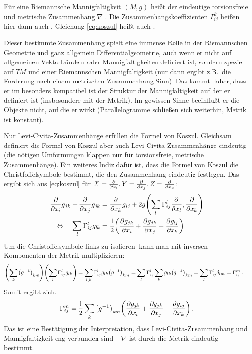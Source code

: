 \begin{defi}
Für eine Riemannsche Mannigfaltigkeit $(M, g)$ heißt der eindeutige torsionsfreie und metrische Zusammenhang $\nabla$ . Die Zusammenhangskoeffizienten $\Gamma_{ij}^k$ heißen hier dann auch . Gleichung \eqref{eq:koszul} heißt auch .
\end{defi}
Dieser bestimmte Zusammenhang spielt eine immense Rolle in der Riemannschen Geometrie und ganz allgemein Differentialgeometrie, auch wenn er nicht auf allgemeinen Vektorbündeln oder Mannigfaltigkeiten definiert ist, sondern speziell auf $TM$ und einer Riemannschen Mannigfaltigkeit (nur dann ergibt z.B.~die Forderung nach einem metrischen Zusammenhang Sinn). Das kommt daher, dass er im besonders kompatibel ist der Struktur der Mannigfaltigkeit auf der er definiert ist (insbesondere mit der Metrik). Im gewissen Sinne beeinflußt er die Objekte nicht, auf die er wirkt (Parallelogramme schließen sich weiterhin, Metrik ist konstant).

Nur Levi-Civita-Zusammenhänge erfüllen die Formel von Koszul. Gleichsam definiert die Formel von Koszul aber auch Levi-Civita-Zusammenhänge eindeutig (die nötigen Umformungen klappen nur für torsionsfreie, metrische Zusammenhänge). Ein weiteres Indiz dafür ist, dass die Formel von Koszul die Christfoffelsymbole bestimmt, die den Zusammenhang eindeutig festlegen. Das ergibt sich aus \eqref{eq:koszul} für $X = \pdv{x_i}, Y = \pdv{x_j}, Z = \pdv{x_k}$:
\begin{align*}
\pdv{x_i} g_{jk} + \pdv{x_j} g_{jk} &= \pdv{x_k} g_{ij} + 2 g\qty(\sum_l \Gamma_{ij}^l \pdv{x_l}, \pdv{x_k})%
\\
\Leftrightarrow \quad \sum_l \Gamma_{ij}^l g_{lk} &= \frac{1}{2} \qty(\pdv{g_{jk}}{x_i} + \pdv{g_{jk}}{x_j} - \pdv{g_{ij}}{x_k})
\end{align*}
Um die Christoffelsymbole links zu isolieren, kann man mit inversen Komponenten der Metrik multiplizieren:
\begin{align*}
\qty(\sum_k \qty(g^{-1})_{km}) \qty(\sum_l \Gamma_{ij}^l g_{lk}) = \sum_{l, k} \Gamma_{ij}^l g_{lk} \qty(g^{-1})_{km} &= \sum_l \Gamma_{ij}^l \sum_k g_{lk} \qty(g^{-1})_{km} = \sum_l \Gamma_{ij}^l \delta_{lm} = \Gamma_{ij}^m \, .
\end{align*}
Somit ergibt sich:
\begin{equation}
\Gamma_{ij}^m = \frac{1}{2} \sum_k \qty(g^{-1})_{km} \qty(\pdv{g_{jk}}{x_i} + \pdv{g_{jk}}{x_j} - \pdv{g_{ij}}{x_k}) \, .
\end{equation}
Das ist eine Bestätigung der Interpretation, dass Levi-Civita-Zusammenhang und Mannigfaltigkeit eng verbunden sind -- $\nabla$ ist durch die Metrik eindeutig bestimmt.



